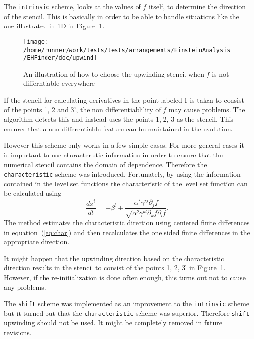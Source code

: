 The {\tt intrinsic} scheme, looks at the values of $f$ itself, to determine
the direction of the stencil. This is basically in order to be able to handle
situations like the one illustrated in 1D in
Figure~\ref{AEIThorns_EHFinder_upwindfig}.
\begin{figure}[ht]
  \begin{center}
    \texttt{[image: /home/runner/work/tests/tests/arrangements/EinsteinAnalysis/EHFinder/doc/upwind]}
  \end{center}
  \caption{An illustration of how to choose the upwinding stencil when $f$
           is not differntiable everywhere}
  \label{AEIThorns_EHFinder_upwindfig}
\end{figure}
If the stencil for calculating derivatives in the point labeled 1 is taken
to consist of the points 1, 2 and 3', the non differentiablility of $f$ may
cause problems. The algorithm detects this and instead uses the points 1, 2, 3
as the stencil. This ensures that a non differentiable feature can be
maintained in the evolution.

However this scheme only works in a few simple cases. For more general cases
it is important to use characteristic information in order to ensure that
the numerical stencil contains the domain of dependence. Therefore the
{\tt characteristic} scheme was introduced. Fortunately, by using the
information contained in the level set functions the characteristic of
the level set function can be calculated using
\begin{equation}
\frac{dx^{i}}{dt}=-\beta^{i}+\frac{\alpha^{2}\gamma^{ij}\partial_{j}f}
{\sqrt{\alpha^{2}\gamma^{kl}\partial_{k}f\partial_{l}f}}. 
\label{eq:char}
\end{equation}
The method estimates the characteristic direction using centered finite
differences in equation~(\ref{eq:char}) and then recalculates the one
sided finite differences in the appropriate direction.

It might happen that the upwinding direction based on the characteristic
direction results in the stencil to consist of the points 1, 2, 3' in 
Figure~\ref{AEIThorns_EHFinder_upwindfig}. However, if the 
re-initialization is done often enough, this turns out not to cause
any problems.

The {\tt shift} scheme was implemented as an improvement to the {\tt intrinsic}
scheme but it turned out that the {\tt characteristic} scheme was superior.
Therefore {\tt shift} upwinding should not be used. It might be completely
removed in future revisions.

